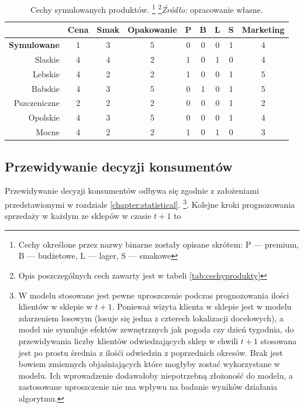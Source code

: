 \documentclass[polish, twoside, 12pt, a4paper]{article}
\theoremstyle{definition}
\theoremstyle{plain}
\theoremstyle{remark}
\begin{document}
\begin{table}[hbt] 
  \centering
  \captionsetup{margin=10pt,font=small,labelfont=bf,width=.8\textwidth}
  \caption[Cechy symulowanych produktów]{Cechy symulowanych produktów. \footnote{Cechy określone przez nazwy binarne zostały opisane skrótem: P --- premium, B --- budżetowe, L --- lager, S --- smakowe} \footnote{Opis poszczególnych cech zawarty jest w tabeli \ref{tab:cechyprodukty}}\textit{Źródło:} opracowanie własne.}
  \label{tab:produkty}
\vspace*{2ex}
  \begin{tabular}{rcccccccc}
  \hline
 & Cena & Smak & Opakowanie & P & B & L & S & Marketing \\ 
  \hline
\textbf{Symulowane} &   1 &   3 &   5 &   0 &   0 &   0 &   1 &   4 \\ 
  Slaskie &   4 &   4 &   2 &   1 &   0 &   1 &   0 &   4 \\ 
  Lebskie &   4 &   2 &   2 &   1 &   0 &   0 &   1 &   5 \\ 
  Babskie &   4 &   3 &   5 &   0 &   1 &   0 &   1 &   5 \\ 
  Pszczeniczne &   2 &   2 &   2 &   0 &   0 &   0 &   1 &   2 \\ 
  Opolskie &   4 &   3 &   5 &   0 &   0 &   0 &   1 &   4 \\ 
  Mocne &   4 &   2 &   2 &   1 &   0 &   1 &   0 &   3 \\ 
   \hline
\end{tabular}
\end{table} 



\subsection{Przewidywanie decyzji konsumentów}

Przewidywanie decyzji konsumentów odbywa się zgodnie z założeniami przedstawionymi w rozdziale \ref{chapter:statistical}. \footnote{W modelu stosowane jest pewne uproszczenie podczas prognozowania ilości klientów w sklepie w $t+1$. Ponieważ wizyta klienta w sklepie jest w modelu zdarzeniem losowym (losuje się jedna z czterech lokalizacji docelowych), a model nie symuluje efektów zewnętrznych jak pogoda czy dzień tygodnia, do przewidywania liczby klientów odwiedzających sklep w chwili $t+1$ stosowana jest po prostu średnia z ilośći odwiedzin z poprzednich okresów. Brak jest bowiem zmiennych objaśniających które mogłyby zostać wykorzystane w modelu. Ich wprowadzenie dodawałoby niepotrzebną złożoność do modelu, a zastosowane uproszczenie nie ma wpływu na badanie wyników działania algorytmu.}. Kolejne kroki prognozowania sprzedaży w każdym ze sklepów w czasie $t+1$ to 
\end{document}
